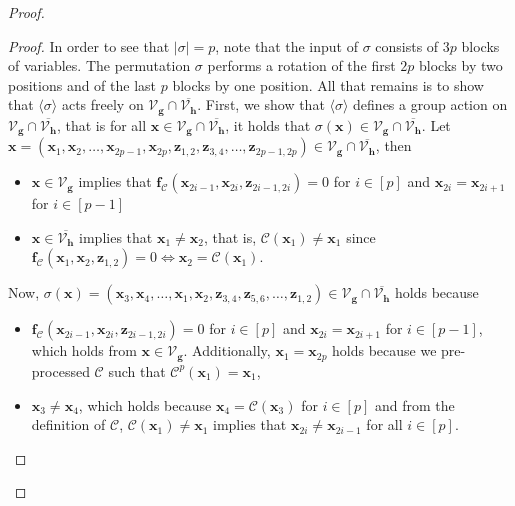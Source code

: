 \documentclass[10pt,a4paper]{article}
\theoremstyle{definition}
\theoremstyle{remark}
\def\abs#1{\left|#1\right|}
\def\a#1{\langle#1\rangle}
\newcommand{\calC}{\mathcal{C}}
\newcommand{\calV}{\mathcal{V}}
\newcommand{\vecf}{\ensuremath{\boldsymbol{f}}}
\newcommand{\vecg}{\ensuremath{\boldsymbol{g}}}
\newcommand{\vech}{\ensuremath{\boldsymbol{h}}}
\newcommand{\vecx}{\ensuremath{\boldsymbol{x}}}
\newcommand{\vecz}{\ensuremath{\boldsymbol{z}}}
\providecommand{\bracks}[1]{\left[#1\right]}
\begin{document}
\begin{proof}
          \begin{proof}              In order to see that $\abs{\sigma} = p$, note that the input of $\sigma$ consists
              of $3p$ blocks of variables. The permutation $\sigma$ performs a rotation of the
              first $2p$ blocks by two positions and of the last $p$ blocks by one
              position.
              All that remains is to show that $\a{\sigma}$ acts freely on
                    $\calV_{\vecg} \cap \overline{\calV_{\vech}}$.
                    First, we show that $\a{\sigma}$ defines a group action on
                    $\calV_{\vecg} \cap \overline{\calV_{\vech}} $, that is
                    for all $\vecx \in \calV_{\vecg} \cap
                    \overline{\calV_{\vech}}$, it holds that $\sigma(\vecx) \in
                    \calV_{\vecg} \cap \overline{\calV_{\vech}}$.
                    Let $\vecx = (\vecx_1, \vecx_2,
                    \dots, \vecx_{2p-1}, \vecx_{2p}, \vecz_{1,2}, \vecz_{3,4}, \dots, \vecz_{2p-
                    1,2p} ) \in \calV_{\vecg} \cap \overline{\calV_{\vech}} $,
                    then
                    \begin{itemize}
                        \item $\vecx \in \calV_{\vecg}$ implies that
                        $\vecf_{\calC}(\vecx_{2i-1},\vecx_{2i},
                        \vecz_{2i-1,2i}) = 0$ for $i \in \bracks{p}$ and
                        $\vecx_{2i} = \vecx_{2i+1}$ for $i \in \bracks{p-1}$
                        \item $\vecx \in \overline{\calV_{\vech}}$ implies that
                        $\vecx_1 \neq \vecx_2$, that is,
                        $\calC(\vecx_{1}) \neq \vecx_1$ since
                        $\vecf_{\calC}(\vecx_{1},\vecx_{2},
                        \vecz_{1,2}) = 0 \Leftrightarrow \vecx_2 =
                        \calC(\vecx_{1}) $.
                    \end{itemize}
                Now, $\sigma(\vecx) = (\vecx_{3}, \vecx_{4},
                \ldots, \vecx_{1}, \vecx_{2}, \vecz_{3,4}, \vecz_{5,6}, \ldots,
                \vecz_{1,2}) \in  \calV_{\vecg} \cap
                \overline{\calV_{\vech}}$ holds because
                \begin{itemize}
                    \item $\vecf_{\calC}(\vecx_{2i-1},\vecx_{2i},
                    \vecz_{2i-1,2i}) = 0$ for $i \in \bracks{p}$ and
                    $\vecx_{2i} = \vecx_{2i+1}$ for $i \in \bracks{p-1}$, which holds
                    from $\vecx \in \calV_{\vecg}$. Additionally, $\vecx_1 = \vecx_{2p}$ holds because we pre-processed $\calC$ such that $\calC^p(\vecx_1) = \vecx_{1}$,
                    \item $\vecx_{3} \neq \vecx_{4}$, which holds because
                    $\vecx_{4}  = \calC(\vecx_{3})$ for $i \in \bracks{p}$
                    and from the definition of $\calC$, $\calC(\vecx_{1})
                    \neq \vecx_1$ implies that $\vecx_{2i} \neq \vecx_{2i-1}$ for all
                    $i \in \bracks{p}$.
                \end{itemize}


\end{proof}
\end{proof}
\end{document}
